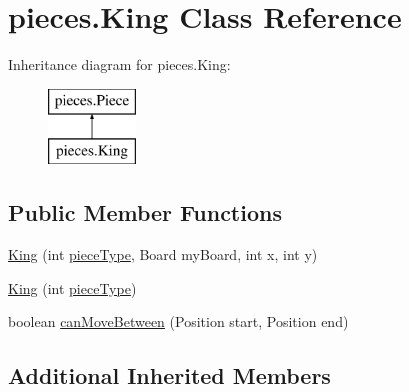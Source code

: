 \hypertarget{classpieces_1_1_king}{\section{pieces.\-King Class Reference}
\label{classpieces_1_1_king}
}
Inheritance diagram for pieces.\-King\-:\begin{figure}[H]
\begin{center}
\leavevmode
\includegraphics[height=2.000000cm]{classpieces_1_1_king}
\end{center}
\end{figure}
\subsection*{Public Member Functions}
\begin{DoxyCompactItemize}
\item 
\hyperlink{classpieces_1_1_king_a684c747c60fc259009d31bc181207684}{King} (int \hyperlink{classpieces_1_1_piece_ae40d6201d0aed36f369dd9d8f55892e3}{piece\-Type}, Board my\-Board, int x, int y)
\item 
\hyperlink{classpieces_1_1_king_a3aae06954339042f484172df9cccbece}{King} (int \hyperlink{classpieces_1_1_piece_ae40d6201d0aed36f369dd9d8f55892e3}{piece\-Type})
\item 
boolean \hyperlink{classpieces_1_1_king_a856cf67c82dd9f19d0aec479677c9260}{can\-Move\-Between} (Position start, Position end)
\end{DoxyCompactItemize}
\subsection*{Additional Inherited Members}


